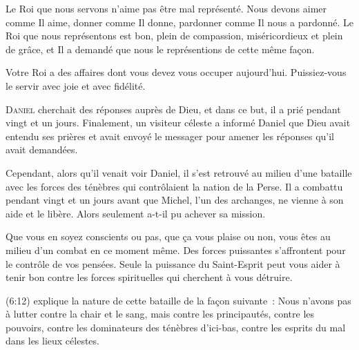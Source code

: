 Le Roi que nous servons n'aime pas être mal représenté.
 Nous devons aimer comme Il aime, donner comme Il donne, pardonner
 comme Il nous a pardonné. Le Roi que nous représentons est bon,
 plein de compassion, miséricordieux et plein de grâce,
 et Il a demandé que nous le représentions de cette même fa\c{c}on. 

Votre Roi a des affaires dont vous devez vous occuper aujourd'hui.
 Puissiez-vous le servir avec joie et avec fidélité. 

\dvrule







\lettrine{D}{aniel} cherchait des réponses auprès de Dieu,
 et dans ce but, il a prié pendant vingt et un jours.
 Finalement, un visiteur céleste a informé Daniel que Dieu avait entendu
 ses prières et avait envoyé le messager pour amener les réponses
 qu'il avait demandées. 

Cependant, alors qu'il venait voir Daniel, il s'est retrouvé au milieu
 d'une bataille avec les forces des ténèbres qui contrôlaient
 la nation de la Perse. Il a combattu pendant vingt et un jours
 avant que Michel, l'un des archanges, ne vienne à son aide et le libère.
 Alors seulement a-t-il pu achever sa mission. 


Que vous en soyez conscients ou pas, que \c{c}a vous plaise ou non,
 vous êtes au milieu d'un combat en ce moment même.
 Des forces puissantes s'affrontent pour le contrôle de vos pensées.
 Seule la puissance du Saint-Esprit peut vous aider à tenir bon contre
 les forces spirituelles qui cherchent à vous détruire. 

(6:12) explique la nature de cette bataille
 de la fa\c{c}on suivante~: \Og Nous n'avons pas à lutter contre la chair
 et le sang, mais contre les principautés, contre les pouvoirs,
 contre les dominateurs des ténèbres d'ici-bas,
 contre les esprits du mal dans les lieux célestes. \Fg{}

